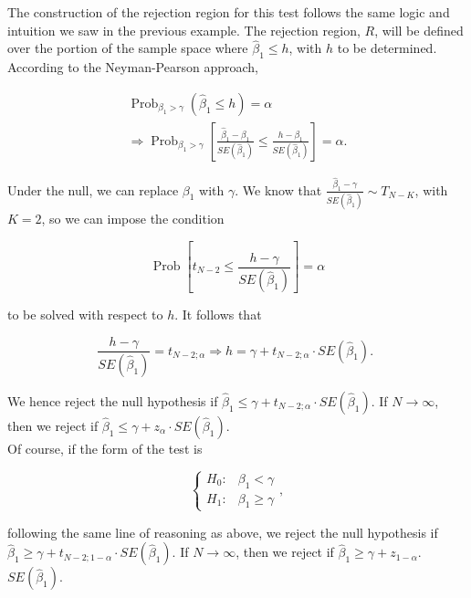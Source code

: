 The construction of the rejection region for this test follows the same logic and intuition we saw in the previous example. The rejection region, $R$, will be defined over the portion of the sample space where $\widehat{\beta}_{1} \leq h$, with $h$ to be determined. According to the Neyman-Pearson approach,

$$
\begin{gathered}
\operatorname{Prob}_{\beta_{1}>\gamma}\left(\widehat{\beta}_{1} \leq h\right)=\alpha \\
\Longrightarrow \operatorname{Prob}_{\beta_{1}>\gamma}\left[\frac{\widehat{\beta}_{1}-\beta_{1}}{S E\left(\widehat{\beta}_{1}\right)} \leq \frac{h-\beta_{1}}{S E\left(\widehat{\beta}_{1}\right)}\right]=\alpha .
\end{gathered}
$$

Under the null, we can replace $\beta_{1}$ with $\gamma$. We know that $\frac{\widehat{\beta}_{1}-\gamma}{S E\left(\widehat{\beta}_{1}\right)} \sim T_{N-K}$, with $K=2$, so we can impose the condition

$$
\operatorname{Prob}\left[t_{N-2} \leq \frac{h-\gamma}{S E\left(\widehat{\beta}_{1}\right)}\right]=\alpha
$$

to be solved with respect to $h$. It follows that

$$
\frac{h-\gamma}{S E\left(\widehat{\beta}_{1}\right)}=t_{N-2 ; \alpha} \Longrightarrow h=\gamma+t_{N-2 ; \alpha} \cdot S E\left(\widehat{\beta}_{1}\right) \text {. }
$$

We hence reject the null hypothesis if $\widehat{\beta}_{1} \leq \gamma+t_{N-2 ; \alpha} \cdot S E\left(\widehat{\beta}_{1}\right)$. If $N \longrightarrow \infty$, then we reject if $\widehat{\beta}_{1} \leq \gamma+z_{\alpha} \cdot S E\left(\widehat{\beta}_{1}\right)$.\\
Of course, if the form of the test is

$$
\left\{\begin{array}{ll}
H_{0}: & \beta_{1}<\gamma \\
H_{1}: & \beta_{1} \geq \gamma
\end{array},\right.
$$

following the same line of reasoning as above, we reject the null hypothesis if $\widehat{\beta}_{1} \geq \gamma+t_{N-2 ; 1-\alpha} \cdot S E\left(\widehat{\beta}_{1}\right)$. If $N \longrightarrow \infty$, then we reject if $\widehat{\beta}_{1} \geq \gamma+z_{1-\alpha}$. $S E\left(\widehat{\beta}_{1}\right)$.